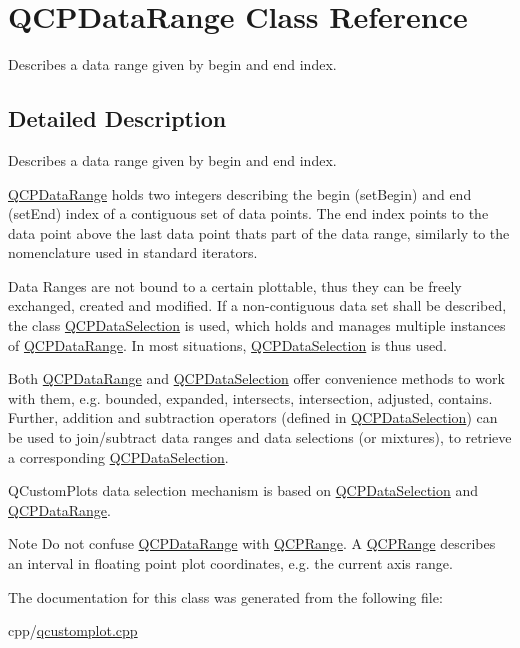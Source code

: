 \hypertarget{class_q_c_p_data_range}{}\section{Q\+C\+P\+Data\+Range Class Reference}
\label{class_q_c_p_data_range}


Describes a data range given by begin and end index.  




\subsection{Detailed Description}
Describes a data range given by begin and end index. 

\mbox{\hyperlink{class_q_c_p_data_range}{Q\+C\+P\+Data\+Range}} holds two integers describing the begin (set\+Begin) and end (set\+End) index of a contiguous set of data points. The end index points to the data point above the last data point that\textquotesingle{}s part of the data range, similarly to the nomenclature used in standard iterators.

Data Ranges are not bound to a certain plottable, thus they can be freely exchanged, created and modified. If a non-\/contiguous data set shall be described, the class \mbox{\hyperlink{class_q_c_p_data_selection}{Q\+C\+P\+Data\+Selection}} is used, which holds and manages multiple instances of \mbox{\hyperlink{class_q_c_p_data_range}{Q\+C\+P\+Data\+Range}}. In most situations, \mbox{\hyperlink{class_q_c_p_data_selection}{Q\+C\+P\+Data\+Selection}} is thus used.

Both \mbox{\hyperlink{class_q_c_p_data_range}{Q\+C\+P\+Data\+Range}} and \mbox{\hyperlink{class_q_c_p_data_selection}{Q\+C\+P\+Data\+Selection}} offer convenience methods to work with them, e.\+g. bounded, expanded, intersects, intersection, adjusted, contains. Further, addition and subtraction operators (defined in \mbox{\hyperlink{class_q_c_p_data_selection}{Q\+C\+P\+Data\+Selection}}) can be used to join/subtract data ranges and data selections (or mixtures), to retrieve a corresponding \mbox{\hyperlink{class_q_c_p_data_selection}{Q\+C\+P\+Data\+Selection}}.

Q\+Custom\+Plot\textquotesingle{}s data selection mechanism is based on \mbox{\hyperlink{class_q_c_p_data_selection}{Q\+C\+P\+Data\+Selection}} and \mbox{\hyperlink{class_q_c_p_data_range}{Q\+C\+P\+Data\+Range}}.

\begin{DoxyNote}{Note}
Do not confuse \mbox{\hyperlink{class_q_c_p_data_range}{Q\+C\+P\+Data\+Range}} with \mbox{\hyperlink{class_q_c_p_range}{Q\+C\+P\+Range}}. A \mbox{\hyperlink{class_q_c_p_range}{Q\+C\+P\+Range}} describes an interval in floating point plot coordinates, e.\+g. the current axis range. 
\end{DoxyNote}


The documentation for this class was generated from the following file\+:\begin{DoxyCompactItemize}
\item 
cpp/\mbox{\hyperlink{qcustomplot_8cpp}{qcustomplot.\+cpp}}\end{DoxyCompactItemize}
